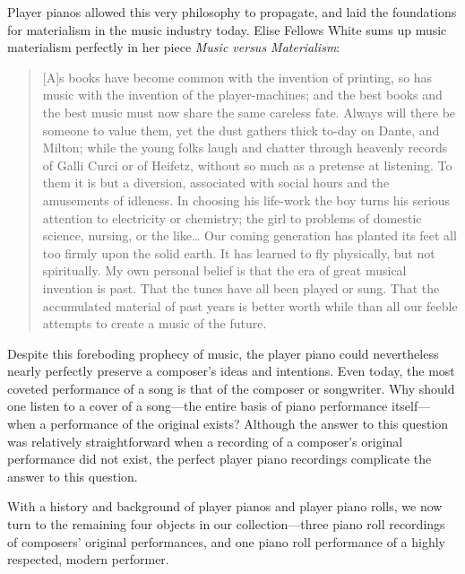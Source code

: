 \documentclass[titlepage,14pt]{article}
\begin{document}
\begin{doublespace}
Player pianos allowed this very philosophy to propagate, and laid the foundations for materialism in the music industry today. Elise Fellows White sums up music materialism perfectly in her piece \textit{Music versus Materialism}:

\begin{quote}
 [A]s books have become common with the invention of
 printing, so has music with the invention of the player-machines;
 and the best books and the best music must now share the same
 careless fate. Always will there be someone to value them, yet
 the dust gathers thick to-day on Dante, and Milton; while the
 young folks laugh and chatter through heavenly records of Galli
Curci or of Heifetz, without so much as a pretense at listening.
 To them it is but a diversion, associated with social hours and the
 amusements of idleness. In choosing his life-work the boy turns
 his serious attention to electricity or chemistry; the girl to problems of domestic science, nursing, or the like\ldots
Our coming generation has planted its feet all too firmly
 upon the solid earth. It has learned to fly physically, but not
 spiritually.
 My own personal belief is that the era of great musical
 invention is past. That the tunes have all been played or sung.
 That the accumulated material of past years is better worth while
 than all our feeble attempts to create a music of the future. \autocite{materialism}
\end{quote}


Despite this foreboding prophecy of music, the player piano could nevertheless nearly perfectly preserve a composer's ideas and intentions. Even today, the most coveted performance of a song is that of the composer or songwriter. Why should one listen to a cover of a song---the entire basis of piano performance itself---when a performance of the original exists? Although the answer to this question was relatively straightforward when a recording of a composer's original performance did not exist, the perfect player piano recordings complicate the answer to this question.

With a history and background of player pianos and player piano rolls,
we now turn to the remaining four objects in our collection---three piano roll recordings of composers' original performances, and one piano roll performance of a highly respected, modern performer.


\end{doublespace}
\end{document}

